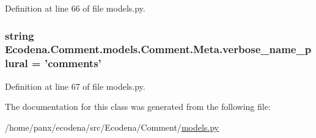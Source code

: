 Definition at line 66 of file models.py.

\hypertarget{class_ecodena_1_1_comment_1_1models_1_1_comment_1_1_meta_ab47cb8c6b3591a60ce7470138312f77a}{
\subsubsection[{verbose\_\-name\_\-plural}]{\setlength{\rightskip}{0pt plus 5cm}string {\bf Ecodena.Comment.models.Comment.Meta.verbose\_\-name\_\-plural} = 'comments'}}
\label{d4/d24/class_ecodena_1_1_comment_1_1models_1_1_comment_1_1_meta_ab47cb8c6b3591a60ce7470138312f77a}


Definition at line 67 of file models.py.



The documentation for this class was generated from the following file:\begin{DoxyCompactItemize}
\item 
/home/panx/ecodena/src/Ecodena/Comment/\hyperlink{_comment_2models_8py}{models.py}\end{DoxyCompactItemize}

